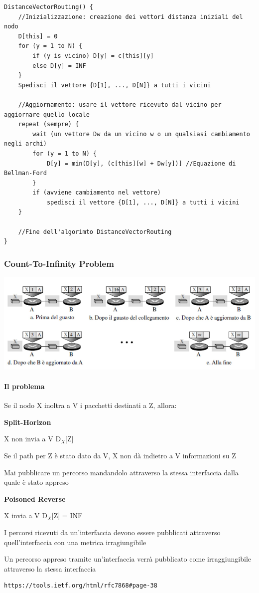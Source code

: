 \documentclass[10pt]{article}
\begin{document}
\begin{lstlisting}
DistanceVectorRouting() {
	//Inizializzazione: creazione dei vettori distanza iniziali del nodo
	D[this] = 0
	for (y = 1 to N) {
		if (y is vicino) D[y] = c[this][y]
		else D[y] = INF
	}
	Spedisci il vettore {D[1], ..., D[N]} a tutti i vicini
	
	//Aggiornamento: usare il vettore ricevuto dal vicino per aggiornare quello locale
	repeat (sempre) {
		wait (un vettore Dw da un vicino w o un qualsiasi cambiamento negli archi)
		for (y = 1 to N) {
			D[y] = min(D[y], (c[this][w] + Dw[y])] //Equazione di Bellman-Ford
		}
		if (avviene cambiamento nel vettore)
			spedisci il vettore {D[1], ..., D[N]} a tutti i vicini
	}
	
	//Fine dell'algorimto DistanceVectorRouting
}
\end{lstlisting}
\pagebreak
\subsubsection{Count-To-Infinity Problem}
\begin{center}
\includegraphics[scale=0.7]{counttoinfinity.png}
\end{center}
\paragraph{Il problema} Se il nodo X inoltra a V i pacchetti destinati a Z, allora:
\begin{list}{}{}
\item \textbf{Split-Horizon}
\begin{list}{}{}
\item X non invia a V D$_X$[Z]
\item Se il path per Z è stato dato da V, X non dà indietro a V informazioni su Z
\item Mai pubblicare un percorso mandandolo attraverso la stessa interfaccia dalla quale è stato appreso
\end{list}
\item \textbf{Poisoned Reverse}
\begin{list}{}{}
\item X invia a V D$_X$[Z] = INF
\item I percorsi ricevuti da un'interfaccia devono essere pubblicati attraverso quell'interfaccia con una metrica irragiungibile
\item Un percorso appreso tramite un'interfaccia verrà pubblicato come irraggiungibile attraverso la stessa interfaccia
\item \begin{verbatim}
https://tools.ietf.org/html/rfc7868#page-38
\end{verbatim}
\end{list}
\end{list}
\pagebreak
\end{document}
